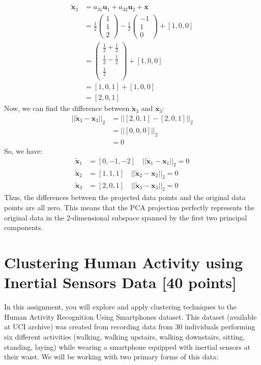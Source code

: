\documentclass[a3paper,12pt]{extarticle} %
\begin{document}
\begin{enumerate}
\begin{align}
\tilde{\mathbf{x}}_3 &= a_{31}\mathbf{u}_1 + a_{32}\mathbf{u}_2 + \bar{\mathbf{x}}\\
&= \frac{1}{2}\begin{pmatrix}
1\\
1\\
2
\end{pmatrix} - \frac{1}{2}\begin{pmatrix}
-1\\
1\\
0
\end{pmatrix} + [1, 0, 0]\\
&= \begin{pmatrix}
\frac{1}{2} + \frac{1}{2}\\
\frac{1}{2} - \frac{1}{2}\\
\frac{1}{2}\\
\end{pmatrix} + [1, 0, 0]\\
&= [1, 0, 1] + [1, 0, 0]\\
&= [2, 0, 1]
\end{align}
Now, we can find the difference between $\tilde{\mathbf{x}}_3$ and $\mathbf{x}_3$:
\begin{align}
||\tilde{\mathbf{x}}_3 - \mathbf{x}_3||_2 &= ||[2, 0, 1] - [2, 0, 1]||_2\\
&= ||[0, 0, 0]||_2\\
&= 0
\end{align}
So, we have:
\begin{align}
\tilde{\mathbf{x}}_1 &= [0, -1, -2] \quad ||\tilde{\mathbf{x}}_1 - \mathbf{x}_1||_2 = 0\\
\tilde{\mathbf{x}}_2 &= [1, 1, 1] \quad ||\tilde{\mathbf{x}}_2 - \mathbf{x}_2||_2 = 0\\
\tilde{\mathbf{x}}_3 &= [2, 0, 1] \quad ||\tilde{\mathbf{x}}_3 - \mathbf{x}_3||_2 = 0
\end{align}
Thus, the differences between the projected data points and the original data points are all zero. This means that the PCA projection perfectly represents the original data in the 2-dimensional subspace spanned by the first two principal components.

\newpage
\section{Clustering Human Activity using Inertial Sensors Data [40 points]}
In this assignment, you will explore and apply clustering techniques to the Human Activity Recognition Using Smartphones dataset. This dataset (available at UCI archive) was created from recording data from 30 individuals performing six different activities (walking, walking upstairs, walking downstairs, sitting, standing, laying) while wearing a smartphone equipped with inertial sensors at their waist. We will be working with two primary forms of this data:


\end{enumerate}
\end{document}
